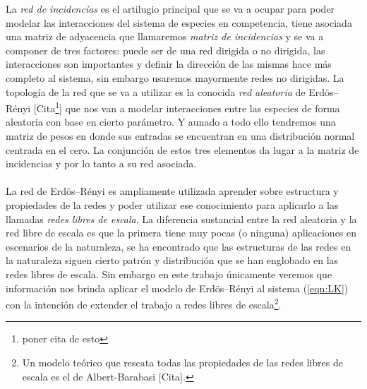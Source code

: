 La \textit{red de incidencias} es el artilugio principal que se va a ocupar para poder modelar las interacciones del sistema de especies en competencia, tiene asociada una matriz de adyacencia que llamaremos \textit{matriz de incidencias} y se va a componer de tres factores: puede ser de una red dirigida o no dirigida, las interacciones son importantes y definir la dirección de las mismas hace más completo al sistema, sin embargo usaremos mayormente redes no dirigidas. La topología de la red que se va a utilizar es la conocida \textit{red aleatoria} de Erdös–Rényi [Cita\footnote{poner cita de esto}] que nos van a modelar interacciones entre las especies de forma aleatoria con base en cierto parámetro. Y aunado a todo ello tendremos una matriz de pesos en donde sus entradas se encuentran en una distribución normal centrada en el cero. La conjunción de estos tres elementos da lugar a la matriz de incidencias y por lo tanto a su red asociada.\\
\\
La red de Erdös–Rényi es ampliamente utilizada aprender sobre estructura y propiedades de la redes y poder utilizar ese conocimiento para aplicarlo a las llamadas \textit{redes libres de escala}. La diferencia sustancial entre la red aleatoria y la red libre de escala es que la primera tiene muy pocas (o ninguna) aplicaciones en escenarios de la naturaleza, se ha encontrado que las estructuras de las redes en la naturaleza siguen cierto patrón y distribución que se han englobado en las redes libres de escala. Sin embargo en este trabajo únicamente veremos que información nos brinda aplicar el modelo de Erdös–Rényi al sistema (\ref{eqn:LK}) con la intención de extender el trabajo a redes libres de escala\footnote{Un modelo teórico que rescata todas las propiedades de las redes libres de escala es el de Albert-Barabasi [Cita].}. 

